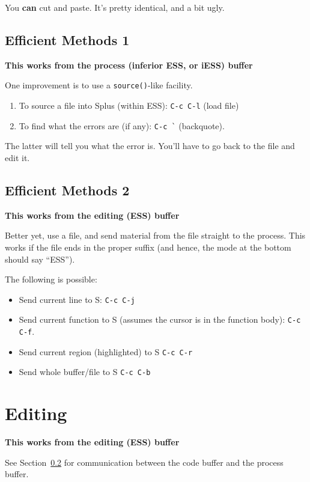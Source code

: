 \documentclass{article}
\begin{document}
You \textbf{can} cut and paste.  It's pretty identical, and a bit ugly.

\subsection{Efficient Methods 1}
\label{sec:cutpaste:eff1}

\textbf{This works from the process (inferior ESS, or iESS) buffer}

One improvement is to use a \verb+source()+-like facility.

\begin{enumerate}
\item To source a file into Splus (within ESS): \verb+C-c C-l+  (load file)
\item To find what the errors are (if any): \verb+C-c `+ (backquote).
\end{enumerate}

The latter will tell you what the error is.  You'll have to go back to
the file and edit it.

\subsection{Efficient Methods 2}
\label{sec:cutpaste:eff2}

\textbf{This works from the editing (ESS) buffer}

Better yet, use a file, and send material from the file straight to
the process.  This works if the file ends in the proper suffix (and
hence, the mode at the bottom should say ``ESS'').

The following is possible:
\begin{itemize}
\item Send current line to S: \verb+C-c C-j+
\item Send current function to S (assumes the cursor is in the
  function body): \verb+C-c C-f+.
\item Send current region (highlighted) to S  \verb+C-c C-r+
\item Send whole buffer/file to S  \verb+C-c C-b+
\end{itemize}


\section{Editing}
\label{sec:edit}

\textbf{This works from the editing (ESS) buffer}

See Section~\ref{sec:cutpaste:eff2} for communication between the code
buffer and the process buffer.
\end{document}
